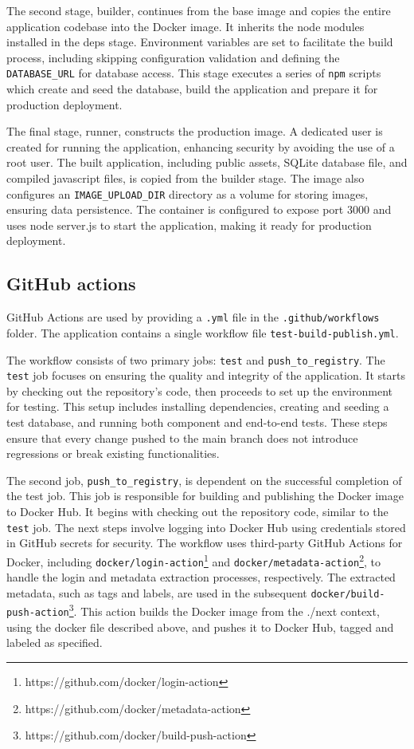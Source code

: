 The second stage, builder, continues from the base image and copies the entire application codebase into the Docker image. It inherits the node modules installed in the deps stage. Environment variables are set to facilitate the build process, including skipping configuration validation and defining the \texttt{DATABASE\_URL} for database access. This stage executes a series of \texttt{npm} scripts which create and seed the database, build the application and prepare it for production deployment.

The final stage, runner, constructs the production image. A dedicated user is created for running the application, enhancing security by avoiding the use of a root user.\cite{root-security} The built application, including public assets, SQLite database file, and compiled javascript files, is copied from the builder stage. The image also configures an \texttt{IMAGE\_UPLOAD\_DIR} directory as a volume for storing images, ensuring data persistence.\cite{docker-volume} The container is configured to expose port 3000 and uses node server.js to start the application, making it ready for production deployment.

\subsection{GitHub actions}

GitHub Actions are used by providing a \texttt{.yml} file in the \texttt{.github/workflows} folder. The application contains a single workflow file \texttt{test-build-publish.yml}.

The workflow consists of two primary jobs: \texttt{test} and \texttt{push\_to\_registry}. The \texttt{test} job focuses on ensuring the quality and integrity of the application. It starts by checking out the repository's code, then proceeds to set up the environment for testing. This setup includes installing dependencies, creating and seeding a test database, and running both component and end-to-end tests. These steps ensure that every change pushed to the main branch does not introduce regressions or break existing functionalities.

The second job, \texttt{push\_to\_registry}, is dependent on the successful completion of the test job. This job is responsible for building and publishing the Docker image to Docker Hub. It begins with checking out the repository code, similar to the \texttt{test} job. The next steps involve logging into Docker Hub using credentials stored in GitHub secrets for security. The workflow uses third-party GitHub Actions for Docker, including \texttt{docker/login-action}\footnote{https://github.com/docker/login-action} and \texttt{docker/metadata-action}\footnote{https://github.com/docker/metadata-action}, to handle the login and metadata extraction processes, respectively. The extracted metadata, such as tags and labels, are used in the subsequent \texttt{docker/build-push-action}\footnote{https://github.com/docker/build-push-action}. This action builds the Docker image from the ./next context, using the docker file described above, and pushes it to Docker Hub, tagged and labeled as specified. 

